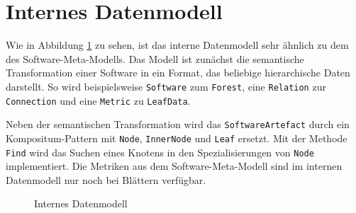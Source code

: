 \section{Internes Datenmodell}
\label{sec:app-model}

Wie in Abbildung \ref{fig:internal-model} zu sehen, ist das interne Datenmodell sehr ähnlich zu dem des Software-Meta-Modells. Das Modell ist zunächst die semantische Transformation einer Software in ein Format, das beliebige hierarchische Daten darstellt. So wird beispielsweise \texttt{Software} zum \texttt{Forest}, eine \texttt{Relation} zur \texttt{Connection} und eine \texttt{Metric} zu \texttt{LeafData}.

Neben der semantischen Transformation wird das \texttt{SoftwareArtefact} durch ein Kompositum-Pattern mit \texttt{Node}, \texttt{InnerNode} und \texttt{Leaf} ersetzt. Mit der Methode \texttt{Find} wird das Suchen eines Knotens in den Spezialisierungen von \texttt{Node} implementiert. Die Metriken aus dem Software-Meta-Modell sind im internen Datenmodell nur noch bei Blättern verfügbar.

\begin{figure}[htb]
  \caption{Internes Datenmodell}
  \label{fig:internal-model}
\end{figure}

